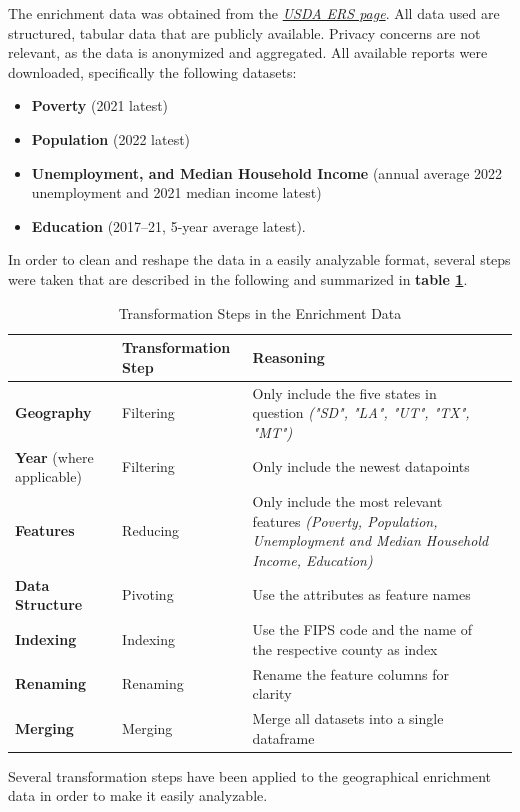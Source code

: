 The enrichment data was obtained from the \textit{\href{https://www.ers.usda.gov/data-products/county-level-data-sets/}{USDA ERS page}}. All data used are structured, tabular data that are publicly available. Privacy concerns are not relevant, as the data is anonymized and aggregated. All available reports were downloaded, specifically the following datasets:

\begin{itemize}
    \item \textbf{Poverty} (2021 latest)
    \item \textbf{Population} (2022 latest)
    \item \textbf{Unemployment, and Median Household Income} (annual average 2022 unemployment and 2021 median income latest)
    \item \textbf{Education} (2017–21, 5-year average latest).
\end{itemize}

In order to clean and reshape the data in a easily analyzable format, several steps were taken that are described in the following and summarized in \textbf{table \ref{tab:enrichment_transformation_summary}}. %

\begin{table}[h]
    \centering
    \begin{tabularx}{\textwidth}{l *{3}{>{\centering\arraybackslash}X}}
    \hline
     & \textbf{Transformation Step} & \textbf{Reasoning} \\
    \hline
    \textbf{Geography} & Filtering & Only include the five states in question \textit{("SD", "LA", "UT", "TX", "MT")} \\
    \textbf{Year} (where applicable) & Filtering & Only include the newest datapoints \\
    \textbf{Features} & Reducing & Only include the most relevant features \textit{(Poverty, Population, Unemployment and Median Household Income, Education)} \\
    \textbf{Data Structure} & Pivoting & Use the attributes as feature names \\
    \textbf{Indexing} & Indexing & Use the FIPS code and the name of the respective county as index \\
    \textbf{Renaming} & Renaming & Rename the feature columns for clarity \\
    \textbf{Merging} & Merging & Merge all datasets into a single dataframe \\
    \hline
    \end{tabularx}
    \caption{Transformation Steps in the Enrichment Data}
    \small
    Several transformation steps have been applied to the geographical enrichment data in order to make it easily analyzable.
    \label{tab:enrichment_transformation_summary}
\end{table}

